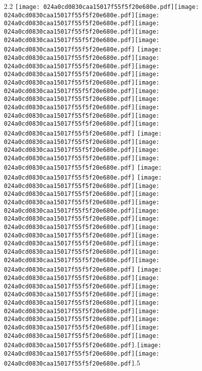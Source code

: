 \documentclass{article}
\newcommand{\origpg}[2]{\texttt{[image: 024a0cd0830caa15017f55f5f20e680e.pdf]}}
\begin{document}
{\vspace{0.646pt}\hspace{36.161pt}2.2 \origpg2{145.74pt 627.72pt 160.09pt 643.86pt}\hspace{-0.371pt}\origpg2{159.72pt 627.72pt 167.79pt 643.86pt}\hspace{-0.597pt}\origpg2{167.19pt 627.72pt 175.4pt 643.86pt}\origpg2{175.4pt 627.72pt 182.57pt 643.86pt}\hspace{-0.21pt}\origpg2{182.36pt 627.72pt 190.42pt 643.86pt}\origpg2{190.32pt 627.72pt 197.68pt 643.86pt} \origpg2{201.86pt 627.72pt 210.07pt 643.86pt}\hspace{-0.258pt}\origpg2{209.82pt 627.72pt 217.43pt 643.86pt}\hspace{-0.387pt}\origpg2{217.05pt 627.72pt 225.12pt 643.86pt}\hspace{-0.597pt}\origpg2{224.52pt 627.72pt 82.5mm 643.86pt}\origpg2{234.64pt 627.72pt 241.81pt 643.86pt}\hspace{-0.178pt}\origpg2{241.63pt 627.72pt 249.7pt 643.86pt}\origpg2{249.8pt 627.72pt 258.43pt 643.86pt}\origpg2{258.43pt 627.72pt 266.5pt 643.86pt}\origpg2{266.42pt 627.72pt 273.04pt 643.86pt}\hspace{-0.597pt}\origpg2{272.44pt 627.72pt 280.51pt 643.86pt} \origpg2{284.48pt 627.72pt 291.1pt 643.86pt}\hspace{-0.113pt}\origpg2{290.99pt 627.72pt 298.15pt 643.86pt}\origpg2{298.2pt 627.72pt 304.58pt 643.86pt}\hspace{-0.113pt}\origpg2{304.46pt 627.72pt 311.63pt 643.86pt} \origpg2{315.76pt 627.72pt 322.93pt 643.86pt} \origpg2{327.06pt 627.72pt 334.11pt 643.86pt}\hspace{0.161pt}\origpg2{334.27pt 627.72pt 342.34pt 643.86pt}\origpg2{342.44pt 627.72pt 349.61pt 643.86pt}\hspace{-0.662pt}\origpg2{348.95pt 627.72pt 357.02pt 643.86pt}\hspace{-0.113pt}\origpg2{356.9pt 627.72pt 363.52pt 643.86pt}\hspace{-0.355pt}\origpg2{363.16pt 627.72pt 371.23pt 643.86pt}\hspace{-0.355pt}\origpg2{370.88pt 627.72pt 378.93pt 643.86pt}\origpg2{378.84pt 627.72pt 386.2pt 643.86pt}\origpg2{386.29pt 627.72pt 394.93pt 643.86pt}\origpg2{394.93pt 627.72pt 403pt 643.86pt}\origpg2{402.92pt 627.72pt 411.55pt 643.86pt} \origpg2{415.67pt 627.72pt 423.74pt 643.86pt}\origpg2{423.84pt 627.72pt 431pt 643.86pt}\hspace{-0.178pt}\origpg2{430.82pt 627.72pt 443.25pt 643.86pt}\origpg2{443.33pt 627.72pt 450.5pt 643.86pt}\hspace{-0.178pt}\origpg2{450.32pt 627.72pt 457.38pt 643.86pt}\hspace{-0.307pt}\origpg2{457.07pt 627.72pt 464.91pt 643.86pt}\hspace{-0.613pt}\origpg2{464.3pt 627.72pt 472.37pt 643.86pt}\hspace{-0.113pt}\origpg2{472.26pt 627.72pt 480.89pt 643.86pt}\hspace{0.376pt}\origpg2{481.27pt 627.72pt 497.41pt 643.86pt}.\hspace{-0.181pt}\origpg2{501.26pt 627.72pt 517.4pt 643.86pt}\origpg2{517.4pt 627.72pt 533.54pt 643.86pt}.5 

}
\end{document}

